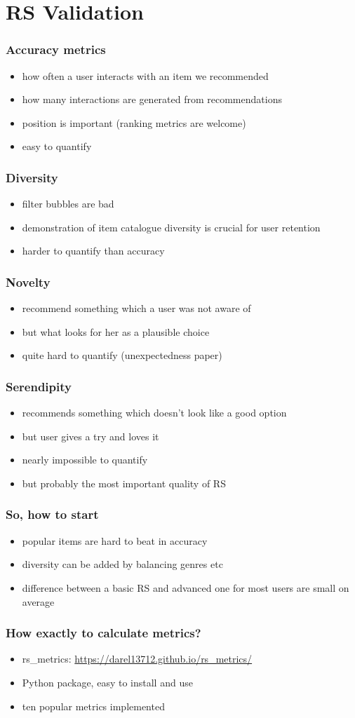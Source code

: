 \documentclass[t]{beamer}
\begin{document}
\section{RS Validation}
\begin{frame}
  \frametitle{Accuracy metrics}
  \begin{itemize}
  \item how often a user interacts with an item we recommended
  \item how many interactions are generated from recommendations
  \item position is important (ranking metrics are welcome)
  \item easy to quantify
  \end{itemize}
\end{frame}
\begin{frame}
  \frametitle{Diversity}
  \begin{itemize}
  \item filter bubbles are bad
  \item demonstration of item catalogue diversity is crucial for user retention
  \item harder to quantify than accuracy
  \end{itemize}
\end{frame}
\begin{frame}
  \frametitle{Novelty}
  \begin{itemize}
  \item recommend something which a user was not aware of
  \item but what looks for her as a plausible choice
  \item quite hard to quantify (unexpectedness paper)
  \end{itemize}
\end{frame}
\begin{frame}
  \frametitle{Serendipity}
  \begin{itemize}
  \item recommends something which doesn't look like a good option
  \item but user gives a try and loves it
  \item nearly impossible to quantify
  \item but probably the most important quality of RS
  \end{itemize}
\end{frame}
\begin{frame}
  \frametitle{So, how to start}
  \begin{itemize}
  \item popular items are hard to beat in accuracy
  \item diversity can be added by balancing genres etc
  \item difference between a basic RS and advanced one for most users are small on average
  \end{itemize}
\end{frame}
\begin{frame}
  \frametitle{How exactly to calculate metrics?}
  \begin{itemize}
  \item rs\_metrics: \url{https://darel13712.github.io/rs_metrics/}
  \item Python package, easy to install and use
  \item ten popular metrics implemented
  \end{itemize}
\end{frame}
\end{document}
